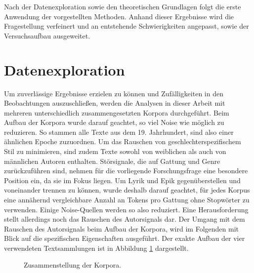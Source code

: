 \documentclass[a4paper,10p]{article}
\begin{document}
Nach der Datenexploration sowie den theoretischen Grundlagen folgt die erste Anwendung der vorgestellten Methoden. Anhand dieser Ergebnisse wird die Fragestellung verfeinert und an entstehende Schwierigkeiten angepasst, sowie der Versuchsaufbau ausgeweitet.


\section{Datenexploration}

Um zuverlässige Ergebnisse erzielen zu können und Zufälligkeiten in den Beobachtungen auszuschließen, werden die Analysen in dieser Arbeit mit mehreren unterschiedlich zusammengesetzten Korpora durchgeführt. Beim Aufbau der Korpora wurde darauf geachtet, so viel Noise wie möglich zu reduzieren. So stammen alle Texte aus dem 19. Jahrhundert, sind also einer ähnlichen Epoche zuzuordnen. Um das Rauschen von geschlechterspezifischem Stil zu minimieren, sind zudem Texte sowohl von weiblichen als auch von männlichen Autoren enthalten. Störsignale, die auf Gattung und Genre zurückzuführen sind, nehmen für die vorliegende Forschungsfrage eine besondere Position ein, da sie im Fokus liegen. Um Lyrik und Epik gegenüberstellen und voneinander trennen zu können, wurde deshalb darauf geachtet, für jedes Korpus eine annähernd vergleichbare Anzahl an Tokens pro Gattung ohne Stopwörter zu verwenden. Einige Noise-Quellen werden so also reduziert. Eine Herausforderung stellt allerdings noch das Rauschen des Autorsignals dar. Der Umgang mit dem Rauschen des Autorsignals beim Aufbau der Korpora, wird im Folgenden mit Blick auf die spezifischen Eigenschaften ausgeführt. Der exakte Aufbau der vier verwendeten Textsammlungen ist in Abbildung \ref{fig:Zusammenstellung_Korpora} dargestellt.


\begin{figure}[h]
	\begin{center}
\end{center}
\caption{Zusammenstellung der Korpora.}
\label{fig:Zusammenstellung_Korpora}
\end{figure}
\end{document}
